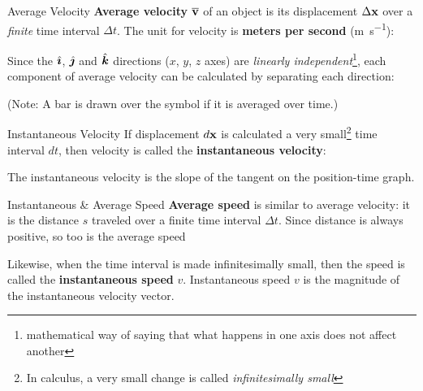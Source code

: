 \documentclass[12pt,compress,aspectratio=169]{beamer}
\newcommand{\iii}{\ensuremath\hat{\bm{\imath}}}
\newcommand{\jjj}{\ensuremath\hat{\bm{\jmath}}}
\newcommand{\kkk}{\ensuremath\hat{\bm{k}}}
\newcommand{\mb}[1]{\ensuremath\mathbf{#1}}
\newcommand{\eq}[2]{\vspace{#1}{\Large\begin{displaymath}#2\end{displaymath}}}
\begin{document}
\begin{frame}{Average Velocity}
  \textbf{Average velocity} $\overline{\mb{v}}$ of an object is its
  displacement $\Delta\mb{x}$ over a \emph{finite} time interval $\Delta t$.
  The unit for velocity is \textbf{meters per second} (\si{\metre\per\second}):

  \eq{-.2in}{
    \boxed{
      \overline{\mb{v}}= \frac{\Delta\mb{x}}{\Delta t}
    }
  }
  
  Since the $\iii$, $\jjj$ and $\kkk$ directions ($x$, $y$, $z$ axes) are
  \emph{linearly independent}\footnote{mathematical way of saying that what happens in
  one axis does not affect another}, each component of average velocity can be
  calculated by separating each direction:

  \eq{-.2in}{
    \boxed{
      \overline{\mb{v}}=
      \frac{\Delta x}{\Delta t}\iii + \frac{\Delta y}{\Delta t}\jjj +
      \frac{\Delta z}{\Delta t}\kkk
    }
  }

  (Note: A bar is drawn over the symbol if it is averaged over time.)
  \vspace{.15in}
\end{frame}



\begin{frame}{Instantaneous Velocity}
  If displacement $d\mb{x}$ is calculated a very small\footnote{In calculus, a very
  small change is called \emph{infinitesimally small}} time interval $dt$, then
  velocity is called the \textbf{instantaneous velocity}:
  
  \eq{-.2in}{
	\overline{\mb{v}}= \frac{\Delta\mb{x}}{\Delta t}\quad\rightarrow\quad
	\boxed{\mb{v}= \frac{d\mb{x}}{dt}}
  }
  
  The instantaneous velocity is the slope of the tangent on the position-time graph.
\end{frame}



\begin{frame}{Instantaneous \& Average Speed}
  \textbf{Average speed} is similar to average velocity: it is the distance $s$
  traveled over a finite time interval $\Delta t$. Since distance is always
  positive, so too is the average speed
 
  \eq{-.2in}{
    \boxed{\overline{v}=\frac{s}{\Delta t}}
  }

  Likewise, when the time interval is made infinitesimally small, then the speed is
  called the \textbf{instantaneous speed} $v$. Instantaneous speed $v$ is the
  magnitude of the instantaneous velocity vector.
\end{frame}
\end{document}
